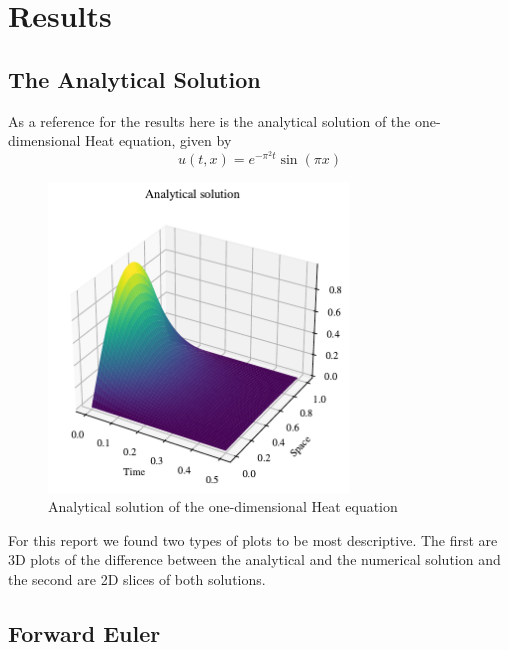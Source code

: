 \documentclass{article}
\theoremstyle{definition}
\begin{document}
\section{Results}

\subsection{The Analytical Solution}
As a reference for the results here is the analytical solution of the one-dimensional Heat equation, given by
\begin{equation*}
    u(t,x) = e^{-\pi^2 t} \sin(\pi x)
\end{equation*}

\begin{figure}[H]%
    \centering
    \includegraphics[width=8cm]{Project3/figures/1dHeat/Analytical_sol.pdf}
    \caption{Analytical solution of the one-dimensional Heat equation }
    \label{fig:Analytic}
\end{figure}

For this report we found two types of plots to be most descriptive. The first are 3D plots of the difference between the analytical and the numerical solution and the second are 2D slices of both solutions. 

\subsection{Forward Euler}
\end{document}
